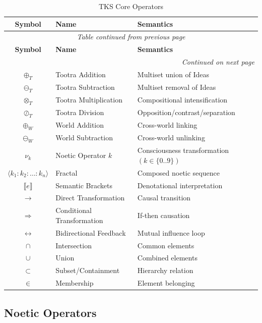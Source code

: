 \documentclass[11pt,twoside]{book}
\newcommand{\noe}[1]{\nu_{#1}}
\newcommand{\sem}[1]{\llbracket #1 \rrbracket}
\newcommand{\Tadd}{\oplus_T}
\newcommand{\Tsub}{\ominus_T}
\newcommand{\Tmul}{\otimes_T}
\newcommand{\Tdiv}{\oslash_T}
\newcommand{\Wadd}{\oplus_W}
\newcommand{\Wsub}{\ominus_W}
\begin{document}
\begin{center}
\small
\begin{longtable}{c|p{3cm}|p{5cm}}
\caption{TKS Core Operators} \\
\toprule
\textbf{Symbol} & \textbf{Name} & \textbf{Semantics} \\
\midrule
\endfirsthead
\multicolumn{3}{c}{\textit{Table continued from previous page}} \\
\toprule
\textbf{Symbol} & \textbf{Name} & \textbf{Semantics} \\
\midrule
\endhead
\midrule
\multicolumn{3}{r}{\textit{Continued on next page}} \\
\endfoot
\bottomrule
\endlastfoot
$\Tadd$ & Tootra Addition & Multiset union of Ideas \\
$\Tsub$ & Tootra Subtraction & Multiset removal of Ideas \\
$\Tmul$ & Tootra Multiplication & Compositional intensification \\
$\Tdiv$ & Tootra Division & Opposition/contrast/separation \\
$\Wadd$ & World Addition & Cross-world linking \\
$\Wsub$ & World Subtraction & Cross-world unlinking \\
$\noe{k}$ & Noetic Operator $k$ & Consciousness transformation $(k \in \{0..9\})$ \\
$\langle k_1:k_2:\ldots:k_n \rangle$ & Fractal & Composed noetic sequence \\
$\sem{e}$ & Semantic Brackets & Denotational interpretation \\
$\to$ & Direct Transformation & Causal transition \\
$\Rightarrow$ & Conditional Transformation & If-then causation \\
$\leftrightarrow$ & Bidirectional Feedback & Mutual influence loop \\
$\cap$ & Intersection & Common elements \\
$\cup$ & Union & Combined elements \\
$\subset$ & Subset/Containment & Hierarchy relation \\
$\in$ & Membership & Element belonging \\
\end{longtable}
\end{center}

\subsection{Noetic Operators}
\end{document}
